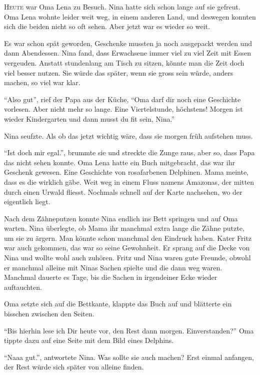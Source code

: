 \newpage
\pagestyle{scrheadings}
\begin{mdframed}[style=mystyle]
\lettrine[lines=3]{\color{red}H}{eute} war Oma Lena zu Besuch. Nina hatte sich schon lange auf sie gefreut. Oma Lena wohnte leider weit weg, in einem anderen Land, und deswegen konnten sich die beiden nicht so oft sehen. Aber jetzt war es wieder so weit. 

Es war schon spät geworden, Geschenke mussten ja noch ausgepackt werden und dann Abendessen. Nina fand, dass Erwachsene immer viel zu viel Zeit mit Essen vergeuden. Anstatt stundenlang am Tisch zu sitzen, könnte man die Zeit doch viel besser nutzen. Sie würde das später, wenn sie gross sein würde, anders machen, so viel war klar.

\enquote{Also gut}, rief der Papa aus der Küche, \enquote{Oma darf dir noch eine Geschichte vorlesen. Aber nicht mehr so lange. Eine Viertelstunde, höchstens! Morgen ist wieder Kindergarten und dann musst du fit sein, Nina.}

Nina seufzte. Als ob das jetzt wichtig wäre, dass sie morgen früh aufstehen muss. 

\enquote{Ist doch mir egal.}, brummte sie und streckte die Zunge raus, aber so, dass Papa das nicht sehen konnte. Oma Lena hatte ein Buch mitgebracht, das war ihr Geschenk gewesen. Eine Geschichte von rosafarbenen Delphinen. Mama meinte, dass es die wirklich gäbe. Weit weg in einem Fluss namens Amazonas, der mitten durch einen Urwald fliesst. Nochmals schnell auf der Karte nachsehen, wo der eigentlich liegt.

Nach dem Zähneputzen konnte Nina endlich ins Bett springen und auf Oma warten. Nina überlegte, ob Mama ihr manchmal extra lange die Zähne putzte, um sie zu ärgern. Man könnte schon manchmal den Eindruck haben. Kater Fritz war auch gekommen, das war so seine Gewohnheit. Er sprang auf die Decke von Nina und wollte wohl auch zuhören. Fritz und Nina waren gute Freunde, obwohl er manchmal alleine mit Ninas Sachen spielte und die dann weg waren. Manchmal dauerte es Tage, bis die Sachen in irgendeiner Ecke wieder auftauchten. 

Oma setzte sich auf die Bettkante, klappte das Buch auf und blätterte ein bisschen zwischen den Seiten.

\enquote{Bis hierhin lese ich Dir heute vor, den Rest dann morgen. Einverstanden?} Oma tippte dazu auf eine Seite mit dem Bild eines Delphins. 

\enquote{Naaa gut.}, antwortete Nina. Was sollte sie auch machen? Erst einmal anfangen, der Rest würde sich später von alleine finden.
\end{mdframed}\medskip

